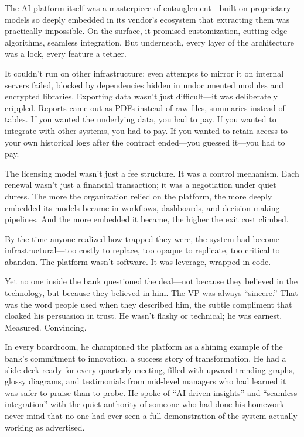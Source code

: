The AI platform itself was a masterpiece of entanglement—built on proprietary models so deeply embedded in its vendor’s ecosystem that extracting them was practically impossible. On the surface, it promised customization, cutting-edge algorithms, seamless integration. But underneath, every layer of the architecture was a lock, every feature a tether.

It couldn’t run on other infrastructure; even attempts to mirror it on internal servers failed, blocked by dependencies hidden in undocumented modules and encrypted libraries. Exporting data wasn’t just difficult—it was deliberately crippled. Reports came out as PDFs instead of raw files, summaries instead of tables. If you wanted the underlying data, you had to pay. If you wanted to integrate with other systems, you had to pay. If you wanted to retain access to your own historical logs after the contract ended—you guessed it—you had to pay.

The licensing model wasn’t just a fee structure. It was a control mechanism. Each renewal wasn’t just a financial transaction; it was a negotiation under quiet duress. The more the organization relied on the platform, the more deeply embedded its models became in workflows, dashboards, and decision-making pipelines. And the more embedded it became, the higher the exit cost climbed.

By the time anyone realized how trapped they were, the system had become infrastructural—too costly to replace, too opaque to replicate, too critical to abandon. The platform wasn’t software. It was leverage, wrapped in code.

Yet no one inside the bank questioned the deal—not because they believed in the technology, but because they believed in him. The VP was always “sincere.” That was the word people used when they described him, the subtle compliment that cloaked his persuasion in trust. He wasn’t flashy or technical; he was earnest. Measured. Convincing.

In every boardroom, he championed the platform as a shining example of the bank’s commitment to innovation, a success story of transformation. He had a slide deck ready for every quarterly meeting, filled with upward-trending graphs, glossy diagrams, and testimonials from mid-level managers who had learned it was safer to praise than to probe. He spoke of “AI-driven insights” and “seamless integration” with the quiet authority of someone who had done his homework—never mind that no one had ever seen a full demonstration of the system actually working as advertised.

